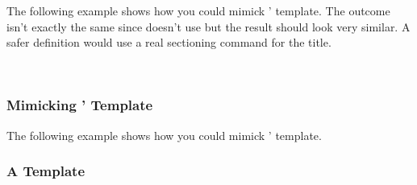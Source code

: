 \documentclass{xsim-manual}
\begin{document}
The following example shows how you could mimick ' 
template.  The outcome isn't exactly the same since  doesn't use
 but the result should look very similar.  A safer definition
would use a real sectioning command for the title.

\begin{sourcecode}
  \usepackage{needspace}
    {%
      \par\vspace{\baselineskip}
      \noindent
      \textbf{\XSIMmixedcase{\GetExerciseName}~}%
    }
    {}
\end{sourcecode}

\subsubsection{Mimicking '  Template}
\label{sec:margin-template}

The following example shows how you could mimick '
 template.

\begin{sourcecode}
    {%
      \trivlist
      \item[\llap{%
        \smash{%
          \tabular[t]{@{}r@{}}
            \textbf{\XSIMmixedcase{\GetExerciseName}~\GetExerciseProperty{counter}}
            \IfExercisePropertySetT{points}{%
              \tabularnewline
              (%
                \printgoal{\GetExerciseProperty{points}}%
                \GetExercisePropertyT{bonus-points}{+\printgoal{#1}}%
                \,\XSIMtranslate{point-abbr}%
              )%
            }%
          \endtabular
        }%
      }]\relax
    }
    {\endtrivlist}
\end{sourcecode}

\subsubsection{A  Template}
\label{sec:minimal-template}
\end{document}
